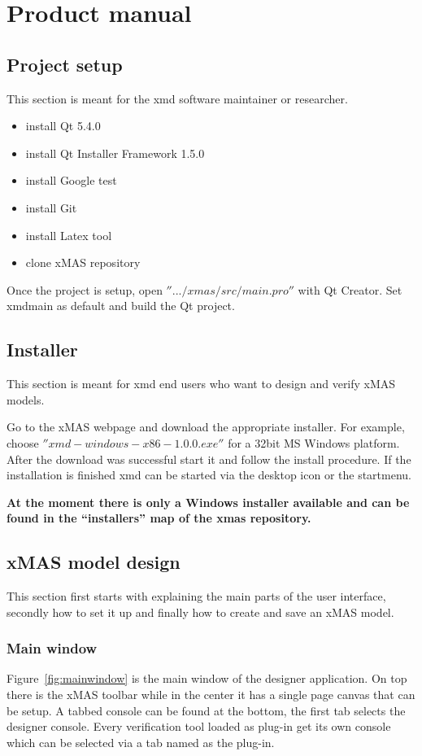 \chapter{Product manual}

\section{Project setup}
This section is meant for the xmd software maintainer or researcher.

\begin{itemize}
\item install Qt 5.4.0
\item install Qt Installer Framework 1.5.0
\item install Google test
\item install Git
\item install Latex tool
\item clone xMAS repository
\end{itemize}

Once the project is setup, open $''.../xmas/src/main.pro''$ with Qt Creator.
Set xmdmain as default and build the Qt project.

\section{Installer}
This section is meant for xmd end users who want to design and verify xMAS models.

Go to the xMAS webpage and download the appropriate installer. For example,
choose $''xmd-windows-x86-1.0.0.exe''$ for a 32bit MS Windows platform. After
the download was successful start it and follow the install procedure.
If the installation is finished xmd can be started via the desktop icon or the startmenu.

\begin{tcolorbox}[colback=white]
\textbf{
At the moment there is only a Windows installer available and can be found in
the ``installers'' map of the xmas repository.
}
\end{tcolorbox}

\section{xMAS model design}
This section first starts with explaining the main parts of the user interface,
secondly how to set it up and finally how to create and save an xMAS model.

\subsection{Main window}
Figure~\ref{fig:mainwindow} is the main window of the designer application. On
top there is the xMAS toolbar while in the center it has a single page canvas
that can be setup. A tabbed console can be found at the bottom, the first tab
selects the designer console. Every verification tool loaded as plug-in get its
own console which can be selected via a tab named as the plug-in.

